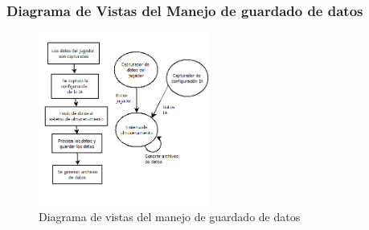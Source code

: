 \subsubsection{Diagrama de Vistas del Manejo de guardado de datos}

\begin{figure}[H]
    \centering
    \includegraphics[width=0.5\textwidth]{recursos/Imagenes/Diagrama2GuardaDatos.png} 
    \caption{Diagrama de vistas del manejo de guardado de datos}
    \label{fig:mi_imagen}
\end{figure}
